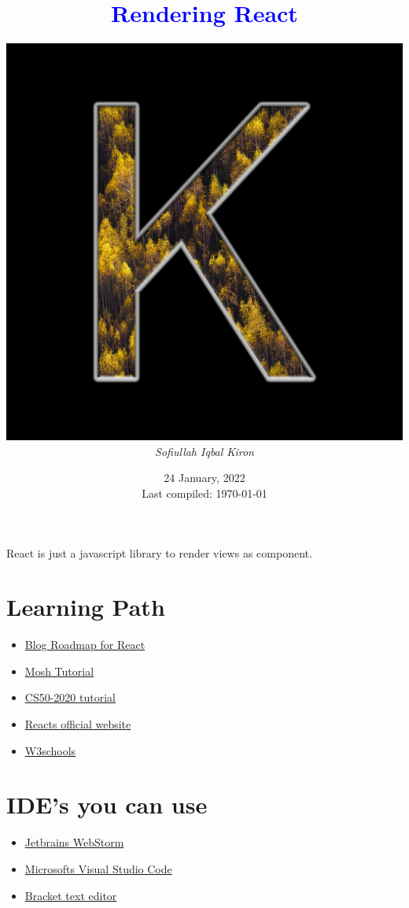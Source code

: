 \documentclass[12 pt, letterpaper]{extarticle}
\title{\textcolor{blue}{Rendering React}}
\author
{
	\includegraphics[scale=0.2]{User Profile.jpg} \\ %
	\textit{Sofiullah Iqbal Kiron} \\
	\R{\rule{11 cm}{2 pt}}
}
\date{24 January, 2022\\ {\tiny Last compiled: \today}}
\begin{document}
\maketitle
\justify

React is just a javascript library to render views as component.

\section*{Learning Path}
\begin{itemize}
	\item \href{https://dev.to/ruppysuppy/the-complete-react-roadmap-1ho4}{Blog Roadmap for React}
	\item \href{https://www.freecoursesonline.me/code-with-mosh-mastering-react-2/}{Mosh Tutorial}
	\item \href{https://youtu.be/jrBhi8wbzPw?list=PLhQjrBD2T380xvFSUmToMMzERZ3qB5Ueu&t=3157}{CS50-2020 tutorial}
	\item \href{https://reactjs.org/tutorial/tutorial.html}{Reacts official website}
	\item \href{https://www.w3schools.com/react/default.asp}{W3schools}
\end{itemize}

\section*{IDE's you can use}
\begin{itemize}
	\item \href{https://www.jetbrains.com/webstorm/}{Jetbrains WebStorm}
	\item \href{https://code.visualstudio.com/docs/nodejs/reactjs-tutorial}{Microsofts Visual Studio Code}
	\item \href{https://brackets.io/}{Bracket text editor}
\end{itemize}
\end{document}
